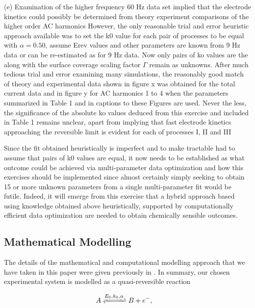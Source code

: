 \documentclass[a4paper, 12pt]{article}
\begin{document}
(e) Examination of the higher frequency 60 Hz data set implied that the 
electrode kinetics could possibly be determined from theory experiment 
comparisons of the higher order AC harmonics However, the only reasonable trial 
and error heuristic approach available was to set the k0 value for each pair of 
processes to be equal with $\alpha = 0.50$, assume Erev values and other 
parameters are known from 9 Hz data or can be re-estimated as for 9 Hz data. Now 
only  pairs of ko values are the along with the surface coverage scaling factor 
$\Gamma$ remain as unknowns. After much tedious trial and error examining many 
simulations, the reasonably good match of theory and experimental data shown in 
figure x was obtained for the total current data and in figure y for AC 
harmonics 1 to 4 when the parameters summarized in Table 1 and in captions to 
these Figures are used.  Never the less, the significance of the absolute ko 
values deduced from this exercise and included in Table 1 remains unclear, apart 
from implying  that fast electrode kinetics  approaching the reversible limit is 
evident for each of processes I, II and III

Since the fit obtained heuristically is imperfect and to make tractable had to 
assume that pairs of k0 values are equal, it now needs to be established as what 
outcome could be achieved   via multi-parameter data optimization and how this 
exercises should be implemented since almost certainly simply seeking to obtain 
15 or more unknown parameters from a single multi-parameter fit would be futile.  
Indeed, it will emerge from this exercise that a hybrid approach based using 
knowledge obtained above heuristically, supported by computationally efficient 
data optimization are needed to obtain chemically sensible outcomes.


\subsection{Mathematical Modelling}


The details of the mathematical and computational modelling approach that we 
have taken in this paper were given previously in \cite{Morrisetal,gavaghan 
2017}. In summary, our chosen experimental system is modelled as a 
quasi-reversible reaction 

\begin{align} \label{reaction}
A \cee{&<=>[E_0,k_0,\alpha]} B + e^-, 
\end{align}
\end{document}
